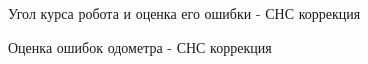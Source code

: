 \documentclass[14pt]{article}
\begin{document}
\begin{figure}
\noindent{}
\caption{Угол курса робота и  оценка его ошибки - СНС коррекция}
\label{fig:gps_heading}
\end{figure}

\begin{figure}
\noindent{}
\caption{Оценка ошибок одометра - СНС коррекция}
\label{fig:gps_odometer}
\end{figure}
\end{document}
